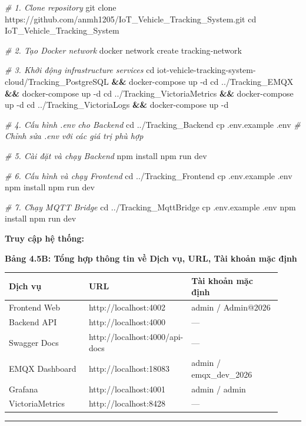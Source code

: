 \documentclass[13pt,a4paper]{extarticle}
\newenvironment{Shaded}{}{}
\newcommand{\AttributeTok}[1]{\textcolor[rgb]{0.49,0.56,0.16}{#1}}
\newcommand{\BuiltInTok}[1]{\textcolor[rgb]{0.00,0.50,0.00}{#1}}
\newcommand{\CommentTok}[1]{\textcolor[rgb]{0.38,0.63,0.69}{\textit{#1}}}
\newcommand{\ExtensionTok}[1]{#1}
\newcommand{\FunctionTok}[1]{\textcolor[rgb]{0.02,0.16,0.49}{#1}}
\newcommand{\KeywordTok}[1]{\textcolor[rgb]{0.00,0.44,0.13}{\textbf{#1}}}
\newcommand{\NormalTok}[1]{#1}
\newcounter{none} %
\newcommand{\thesislongtableorignewline}{}
\let\thesislongtableorignewline\\
\renewcommand{\\}{\thesislongtableorignewline\hline}%
\let\\\thesislongtableorignewline
\newcommand{\thesistabletitle}[1]{%
  \begin{center}\textbf{#1}\end{center}%
}
\begin{document}
\begin{Shaded}
\begin{Highlighting}[]
\CommentTok{\# 1. Clone repository}
\FunctionTok{git}\NormalTok{ clone https://github.com/anmh1205/IoT\_Vehicle\_Tracking\_System.git}
\BuiltInTok{cd}\NormalTok{ IoT\_Vehicle\_Tracking\_System}

\CommentTok{\# 2. Tạo Docker network}
\ExtensionTok{docker}\NormalTok{ network create tracking{-}network}

\CommentTok{\# 3. Khởi động infrastructure services}
\BuiltInTok{cd}\NormalTok{ iot{-}vehicle{-}tracking{-}system{-}cloud/Tracking\_PostgreSQL }\KeywordTok{\&\&} \ExtensionTok{docker{-}compose}\NormalTok{ up }\AttributeTok{{-}d}
\BuiltInTok{cd}\NormalTok{ ../Tracking\_EMQX }\KeywordTok{\&\&} \ExtensionTok{docker{-}compose}\NormalTok{ up }\AttributeTok{{-}d}
\BuiltInTok{cd}\NormalTok{ ../Tracking\_VictoriaMetrics }\KeywordTok{\&\&} \ExtensionTok{docker{-}compose}\NormalTok{ up }\AttributeTok{{-}d}
\BuiltInTok{cd}\NormalTok{ ../Tracking\_VictoriaLogs }\KeywordTok{\&\&} \ExtensionTok{docker{-}compose}\NormalTok{ up }\AttributeTok{{-}d}

\CommentTok{\# 4. Cấu hình .env cho Backend}
\BuiltInTok{cd}\NormalTok{ ../Tracking\_Backend}
\FunctionTok{cp}\NormalTok{ .env.example .env}
\CommentTok{\# Chỉnh sửa .env với các giá trị phù hợp}

\CommentTok{\# 5. Cài đặt và chạy Backend}
\ExtensionTok{npm}\NormalTok{ install}
\ExtensionTok{npm}\NormalTok{ run dev}

\CommentTok{\# 6. Cấu hình và chạy Frontend}
\BuiltInTok{cd}\NormalTok{ ../Tracking\_Frontend}
\FunctionTok{cp}\NormalTok{ .env.example .env}
\ExtensionTok{npm}\NormalTok{ install}
\ExtensionTok{npm}\NormalTok{ run dev}

\CommentTok{\# 7. Chạy MQTT Bridge}
\BuiltInTok{cd}\NormalTok{ ../Tracking\_MqttBridge}
\FunctionTok{cp}\NormalTok{ .env.example .env}
\ExtensionTok{npm}\NormalTok{ install}
\ExtensionTok{npm}\NormalTok{ run dev}
\end{Highlighting}
\end{Shaded}

\textbf{Truy cập hệ thống:}

{\def\LTcaptype{none} %
\thesistabletitle{Bảng 4.5B: Tổng hợp thông tin về Dịch vụ, URL, Tài khoản mặc định}

\begin{longtable}{|p{0.30\linewidth}|p{0.28\linewidth}|p{0.34\linewidth}|}
\hline \textbf{Dịch vụ} & \textbf{URL} & \textbf{Tài khoản mặc định} \\
\hline
\endhead
\hline
\endlastfoot
Frontend Web & http://localhost:4002 & admin / Admin@2026 \\
Backend API & http://localhost:4000 & --- \\
Swagger Docs & http://localhost:4000/api-docs & --- \\
EMQX Dashboard & http://localhost:18083 & admin / emqx\_dev\_2026 \\
Grafana & http://localhost:4001 & admin / admin \\
VictoriaMetrics & http://localhost:8428 & --- \\
\end{longtable}
}

\begin{center}\rule{0.5\linewidth}{0.5pt}\end{center}
\end{document}
